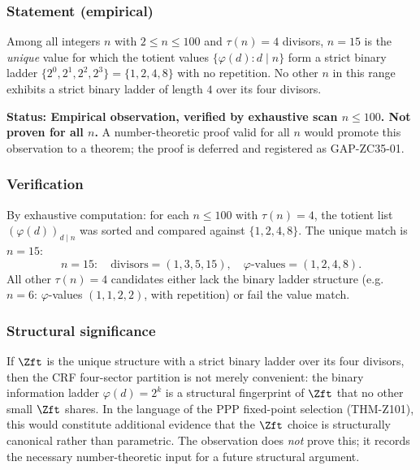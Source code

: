 \documentclass[12pt, a4paper]{article}
\begin{document}
\subsubsection{Statement (empirical)}

\begin{keybox}[title={OBS-ZC35-01: $\Zft$ binary-ladder uniqueness
  (empirical, $n \le 100$)}]
Among all integers $n$ with $2 \le n \le 100$ and $\tau(n) = 4$
divisors, $n = 15$ is the \emph{unique} value for which the totient
values $\{\varphi(d) : d \mid n\}$ form a strict binary ladder
$\{2^0, 2^1, 2^2, 2^3\} = \{1, 2, 4, 8\}$ with no repetition. No other
$n$ in this range exhibits a strict binary ladder of length $4$ over
its four divisors.

\medskip
\textbf{Status: Empirical observation, verified by exhaustive scan
$n \le 100$. Not proven for all $n$.} A number-theoretic proof valid
for all $n$ would promote this observation to a theorem; the proof is
deferred and registered as GAP-ZC35-01.
\end{keybox}

\subsubsection{Verification}

By exhaustive computation: for each $n \le 100$ with $\tau(n) = 4$, the
totient list $(\varphi(d))_{d \mid n}$ was sorted and compared against
$\{1,2,4,8\}$. The unique match is $n = 15$:
\[
  n = 15:\quad
  \text{divisors} = (1,3,5,15),\quad
  \varphi\text{-values} = (1,2,4,8).
\]
All other $\tau(n) = 4$ candidates either lack the binary ladder
structure (e.g.\ $n = 6$: $\varphi$-values $(1,1,2,2)$, with repetition)
or fail the value match.

\subsubsection{Structural significance}

If $\Zft$ is the unique structure with a strict binary ladder over its
four divisors, then the CRF four-sector partition is not merely
convenient: the binary information ladder $\varphi(d) = 2^k$ is a
structural fingerprint of $\Zft$ that no other small $\Zft$ shares. In
the language of the PPP fixed-point selection (THM-Z101), this would
constitute additional evidence that the $\Zft$ choice is structurally
canonical rather than parametric. The observation does \emph{not}
prove this; it records the necessary number-theoretic input for a
future structural argument.
\end{document}
